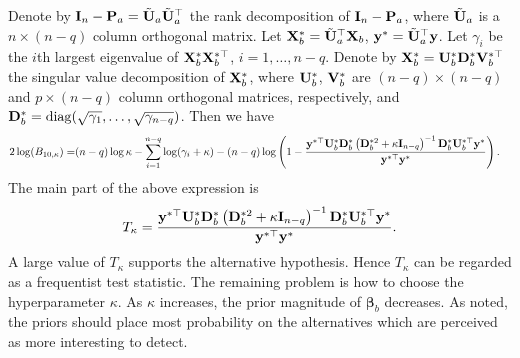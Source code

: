 \documentclass[11pt]{article}
\DeclareMathOperator{\mydiag}{diag}
\newcommand{\By}{\mathbf{y}}    \newcommand{\Bz}{\mathbf{z}}
\newcommand{\bfsym}[1]{\ensuremath{\boldsymbol{#1}}}
\def\bbeta{\bfsym \beta}
\theoremstyle{plain}
\theoremstyle{definition}
\theoremstyle{remark}
\begin{document}
Denote by $\mathbf{I}_n-\mathbf{P}_a=\tilde{\mathbf{U}}_a \tilde{\mathbf{U}}_a^\top$ the rank decomposition of $\mathbf{I}_n - \mathbf{P}_a$, where $\tilde{\mathbf{U}}_a$ is a $n\times (n-q)$ column orthogonal matrix.
Let $\mathbf{X}_b^* = \tilde{\mathbf{U}}_a^\top \mathbf{X}_b$, $\By^* =\tilde \BU_a^\top \By$.
Let $\gamma_i$ be the $i$th largest eigenvalue of $\mathbf{X}^*_b \mathbf{X}_b^{*\top}$, $i=1,\ldots, n-q$.
Denote by $\mathbf{X}_b^* =\mathbf{U}_{b}^* \mathbf{D}_{b}^* \mathbf{V}_b^{*\top}$ the singular value decomposition of $\mathbf{X}_{b}^*$, where  $\mathbf{U}_{b}^*$, $\mathbf{V}_b^*$ are $(n-q)\times (n-q)$ and $p\times (n-q)$ column orthogonal matrices, respectively, and $\BD_{b}^*=\mydiag (\sqrt {\gamma_1},\ldots, \sqrt{\gamma_{n-q}})$.
Then we have
\begin{equation*}
    \begin{split}
        2\log (B_{10,\kappa})
        =&
        (n-q)\log \kappa - \sum_{i=1}^{n-q}\log ( \gamma_i + \kappa )
         -(n-q)\log\left(1-\frac{\By^{*\top} \BU_b^*  \BD_b^{*} \left(  \BD_b^{*2} + \kappa \BI_{n-q} \right)^{-1} \BD_b^{*}   \BU_b^{*\top} \By^* }{\By^{*\top} \By^*}\right)
         .
    \end{split}
\end{equation*}
The main part of the above expression is
\begin{equation*}
    T_{\kappa} = \frac{\By^{*\top} \BU_b^*  \BD_b^{*} \left(  \BD_b^{*2} + \kappa \BI_{n-q} \right)^{-1} \BD_b^{*}   \BU_b^{*\top} \By^* }{\By^{*\top} \By^*}.
\end{equation*}
A large value of $T_{\kappa}$ supports the alternative hypothesis.
Hence $T_{\kappa}$ can be regarded as a frequentist test statistic.
The remaining problem is how to choose the hyperparameter $\kappa$.
As $\kappa$ increases, the prior magnitude of $\bbeta_b$ decreases.
As \cite{Goeman2006} noted, the priors should place most probability on the alternatives which are perceived as more interesting to detect.
\end{document}
